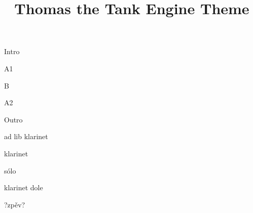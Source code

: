 \documentclass[timestamp]{jazzgrid}
\title{Thomas the Tank Engine Theme}
\begin{document}
\maketitle

\begin{musicsection}{Intro}
	{}
	{\barfour{}{}{}{}{}}
\end{musicsection}

\begin{musicsection}{A1}
\barline
	{}
	{}
	{}
	{}
\barline
	{}
	{}
	{}
	{}
\end{musicsection}

\begin{musicsection}{B}
\barline
	{}
	{}
	{}
	{}
	{}
	{}
	{}
\barline
	{}
	{}
	{}
	{}
\end{musicsection}

\begin{musicsection}{A2}
\barline
	{}
	{}
	{}
	{}
\barline
	{}
	{}
	{}
	{}
\end{musicsection}

\begin{musicsection}{Outro}
	{}
	{}
\end{musicsection}

\begin{multicols*}{2}
	\begin{description}[noitemsep,align=right,labelwidth=\widthof{\bfseries{\scriptsize AA}}]
	\scriptsize
	\item [A] ad lib klarinet
	\item [A] klarinet
	\item [AA] sólo
	\item [A] klarinet dole
	\item [A] ?zpěv?
\end{description}
\vfill\null
\columnbreak
\end{multicols*}
\end{document}
